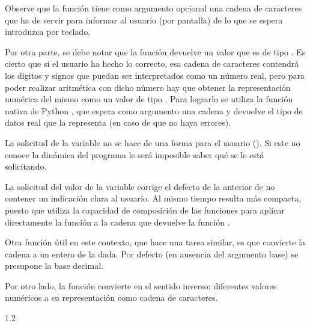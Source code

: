 \documentclass[letterpaper,10pt,english]{sphinxmanual}
\begin{document}
Observe que la función  tiene como argumento opcional una cadena de caracteres que ha de servir para informar al usuario (por pantalla) de lo que se espera introduzca por teclado.

Por otra parte, se debe notar que la función  devuelve un valor que es de tipo . Es cierto que si el usuario ha hecho lo correcto, esa cadena de caracteres contendrá los dígitos y signos que puedan ser interpretados como un número real, pero para poder realizar aritmética con dicho número hay que obtener la representación numérica del mismo como un valor de tipo . Para lograrlo se utiliza la función nativa de Python , que espera como argumento una cadena y devuelve el tipo de datos real que la representa (en caso de que no haya errores).

La solicitud de la variable  no se hace de una forma  para el usuario (). Si este no conoce la dinámica del programa le será imposible saber qué se le está solicitando.

La solicitud del valor de la variable  corrige el defecto de la anterior de no contener un indicación clara al usuario. Al mismo tiempo resulta más compacta, puesto que utiliza la capacidad de composición de las funciones para aplicar directamente la función  a la cadena que devuelve la función .

Otra función útil en este contexto, que hace una tarea similar, es  que convierte la cadena  a un entero de la  dada. Por defecto (en ausencia del argumento base) se presupone la base decimal.

Por otro lado, la función  convierte en el sentido inverso: diferentes valores numéricos a su representación como cadena de caracteres.

\begin{sphinxVerbatim}[commandchars=\\\{\}]
\end{sphinxVerbatim}

\begin{sphinxVerbatim}[commandchars=\\\{\}]
\PYGZsq{}1.2\PYGZsq{}
\end{sphinxVerbatim}
\end{document}

